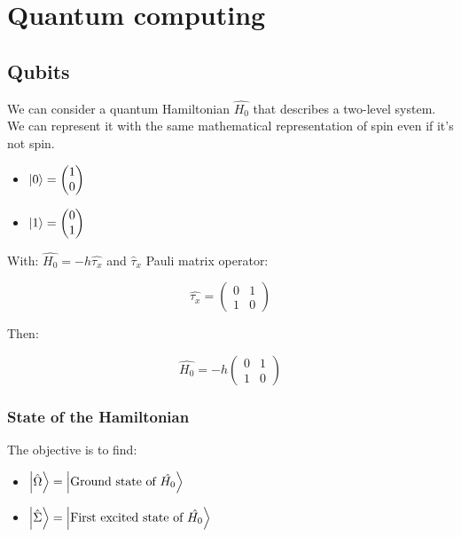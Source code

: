\graphicspath{{chapters/08/}}
\chapter{Quantum computing}

\section{Qubits}
We can consider a quantum Hamiltonian $\hat{H_0}$ that describes a two-level system.
We can represent it with the same mathematical representation of spin even if it's not spin.
\begin{multicols}{2}
	\begin{itemize}
		\item $\ket{0}=\begin{pmatrix}1\\0\end{pmatrix}$
		\item $\ket{1}=\begin{pmatrix}0\\1\end{pmatrix}$
	\end{itemize}
\end{multicols}

With: $\hat{H_0}=-h\hat{\tau_x}$ and $\hat{\tau}_x$ Pauli matrix operator:

$$\hat{\tau_x}=\begin{pmatrix}0&1\\1&0\end{pmatrix}$$

Then:

$$\hat{H_0}=-h\begin{pmatrix}0&1\\1&0\end{pmatrix}$$

	\subsection{State of the Hamiltonian}
	The objective is to find:

	\begin{multicols}{2}
		\begin{itemize}
			\item$\ket{\hat{\Omega}}=\ket{\text{Ground state of }\hat{H_0}}$
			\item$\ket{\hat{\Sigma}}=\ket{\text{First excited state of }\hat{H_0}}$
		\end{itemize}
	\end{multicols}

